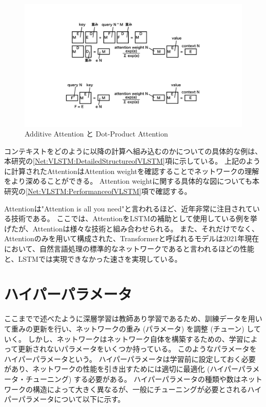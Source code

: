 \begin{figure}[h]
 \centering
 \includegraphics[trim = 200 100 200 100, width=1.0\textwidth, clip]{Figure/2DeepLearning/20Attention.png}
 \caption{Additive Attention と Dot-Product Attention}
 \label{20Attention}
\end{figure}

コンテキストをどのように以降の計算へ組み込むのかについての具体的な例は、本研究の\ref{Net:VLSTM:DetailedStructureofVLSTM}項に示している。
上記のように計算されたAttentionはAttention weightを確認することでネットワークの理解をより深めることができる。
Attention weightに関する具体的な図についても本研究の\ref{Net:VLSTM:PerformanceofVLSTM}項で確認する。

Attentionは"Attention is all you need\cite{AttentionIsAllYouNeed}"と言われるほど、近年非常に注目されている技術である。
ここでは、AttentionをLSTMの補助として使用している例を挙げたが、Attentionは様々な技術と組み合わせられる。
また、それだけでなく、Attentionのみを用いて構成された、Transformerと呼ばれるモデルは2021年現在において、自然言語処理の標準的なネットワークであると言われるほどの性能と、LSTMでは実現できなかった速さを実現している。


\section{ハイパーパラメータ} \label{DL:HyperParameter}

ここまでで述べたように深層学習は教師あり学習であるため、訓練データを用いて重みの更新を行い、ネットワークの重み (パラメータ) を調整 (チューン) していく。
しかし、ネットワークはネットワーク自体を構築するための、学習によって更新されないパラメータをいくつか持っている。
このようなパラメータをハイパーパラメータという。
ハイパーパラメータは学習前に設定しておく必要があり、ネットワークの性能を引き出すためには適切に最適化 (ハイパーパラメータ・チューニング) する必要がある。
ハイパーパラメータの種類や数はネットワークの構造によって大きく異なるが、一般にチューニングが必要とされるハイパーパラメータについて以下に示す。

